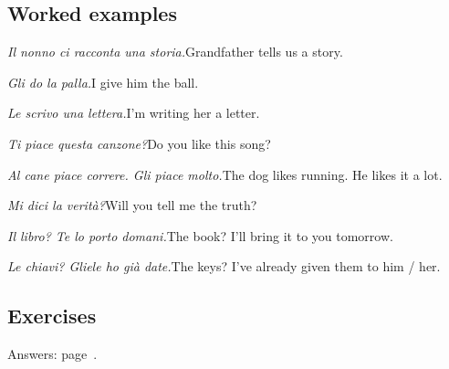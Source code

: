 \documentclass[11pt,a4paper,twoside,openright]{book}
\begin{document}
\subsection*{Worked examples}
\begin{examples}
\item\relax \textit{Il nonno ci racconta una storia.}\newline Grandfather tells us a story.
\item\relax \textit{Gli do la palla.}\newline I give him the ball.
\item\relax \textit{Le scrivo una lettera.}\newline I'm writing her a letter.
\item\relax \textit{Ti piace questa canzone?}\newline Do you like this song?
\item\relax \textit{Al cane piace correre. Gli piace molto.}\newline The dog likes running. He likes it a lot.
\item\relax \textit{Mi dici la verità?}\newline Will you tell me the truth?
\item\relax \textit{Il libro? Te lo porto domani.}\newline The book? I'll bring it to you tomorrow.
\item\relax \textit{Le chiavi? Gliele ho già date.}\newline The keys? I've already given them to him / her.
\end{examples}

\subsection*{Exercises}\label{les:indirect-object-pronouns:exercises}
{\color{muted}\small Answers: page~\pageref{ans:indirect-object-pronouns}.}
\end{document}
